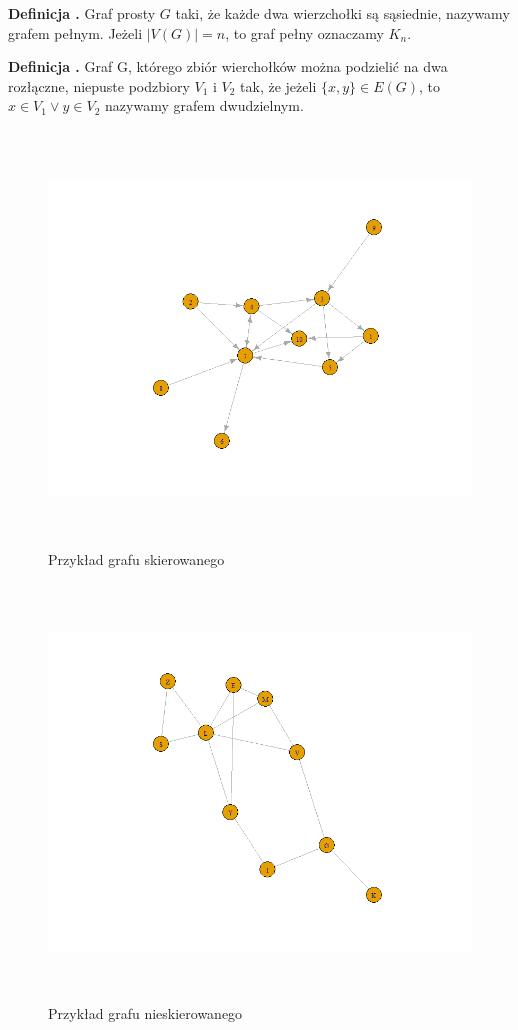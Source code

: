 \noindent
\textbf{Definicja \graphDefinitionIndex.}
\incrementGraphDefinitionIndex
Graf prosty $G$ taki, że każde dwa wierzchołki są sąsiednie, nazywamy grafem pełnym.
Jeżeli $|V(G)| = n$, to graf pełny oznaczamy $K_n$.

\noindent
\textbf{Definicja \graphDefinitionIndex.}
\incrementGraphDefinitionIndex
Graf G, którego zbiór wierchołków można podzielić na dwa rozłączne, niepuste podzbiory $V_1$ i $V_2$ tak,
że jeżeli $\{x, y\} \in E(G)$, to $x \in V_1 \vee y \in V_2$ nazywamy grafem dwudzielnym.

\begin{figure}[ht]
	\centering
	\includegraphics[height=11cm]{partials/images/graph_directed.png}
	\caption{Przykład grafu skierowanego}
\label{Fig:GraphUndirected}
\end{figure}
\FloatBarrier

\begin{figure}[ht]
	\centering
	\includegraphics[height=11cm]{partials/images/graph_undirected.png}
	\caption{Przykład grafu nieskierowanego}
    \label{Fig:GraphDirected}
\end{figure}
\FloatBarrier